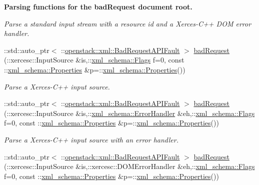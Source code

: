 \begin{Indent}{\bf Parsing functions for the badRequest document root.}
\begin{DoxyCompactItemize}
\begin{DoxyCompactList}\small\item\em Parse a standard input stream with a resource id and a Xerces-\/C++ DOM error handler. \item\end{DoxyCompactList}\item 
::std::auto\_\-ptr$<$ ::\hyperlink{classopenstack_1_1xml_1_1BadRequestAPIFault}{openstack::xml::BadRequestAPIFault} $>$ \hyperlink{namespaceopenstack_1_1xml_a70e4371f5e5484d69ef63dd020bb1c33}{badRequest} (::xercesc::InputSource \&is,::\hyperlink{namespacexml__schema_affb4c227cbd9aa7453dd1dc5a1401943}{xml\_\-schema::Flags} f=0, const ::\hyperlink{namespacexml__schema_ad27ce19a7ee1d3b1064092648898f64c}{xml\_\-schema::Properties} \&p=::\hyperlink{namespacexml__schema_ad27ce19a7ee1d3b1064092648898f64c}{xml\_\-schema::Properties}())
\begin{DoxyCompactList}\small\item\em Parse a Xerces-\/C++ input source. \item\end{DoxyCompactList}\item 
::std::auto\_\-ptr$<$ ::\hyperlink{classopenstack_1_1xml_1_1BadRequestAPIFault}{openstack::xml::BadRequestAPIFault} $>$ \hyperlink{namespaceopenstack_1_1xml_afd13d58e1dda8f10ea2a3c3a0bbd4663}{badRequest} (::xercesc::InputSource \&is,::\hyperlink{namespacexml__schema_ab1c9361bfd3b404eaabf0c31eded79dc}{xml\_\-schema::ErrorHandler} \&eh,::\hyperlink{namespacexml__schema_affb4c227cbd9aa7453dd1dc5a1401943}{xml\_\-schema::Flags} f=0, const ::\hyperlink{namespacexml__schema_ad27ce19a7ee1d3b1064092648898f64c}{xml\_\-schema::Properties} \&p=::\hyperlink{namespacexml__schema_ad27ce19a7ee1d3b1064092648898f64c}{xml\_\-schema::Properties}())
\begin{DoxyCompactList}\small\item\em Parse a Xerces-\/C++ input source with an error handler. \item\end{DoxyCompactList}\item 
::std::auto\_\-ptr$<$ ::\hyperlink{classopenstack_1_1xml_1_1BadRequestAPIFault}{openstack::xml::BadRequestAPIFault} $>$ \hyperlink{namespaceopenstack_1_1xml_a85121a6b57bdfbee8bcb0104184339b6}{badRequest} (::xercesc::InputSource \&is,::xercesc::DOMErrorHandler \&eh,::\hyperlink{namespacexml__schema_affb4c227cbd9aa7453dd1dc5a1401943}{xml\_\-schema::Flags} f=0, const ::\hyperlink{namespacexml__schema_ad27ce19a7ee1d3b1064092648898f64c}{xml\_\-schema::Properties} \&p=::\hyperlink{namespacexml__schema_ad27ce19a7ee1d3b1064092648898f64c}{xml\_\-schema::Properties}())

\end{DoxyCompactItemize}
\end{Indent}
